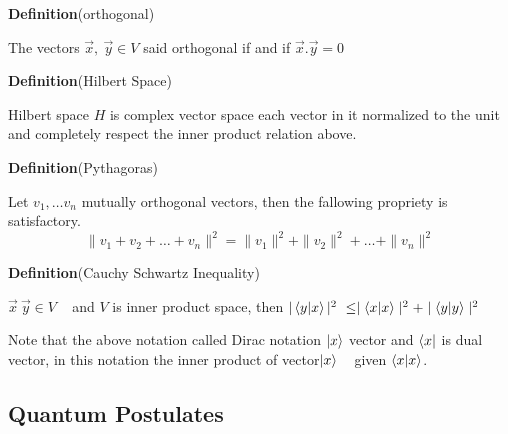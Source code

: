 
\textbf{Definition}{(orthogonal)}

The vectors $\vec{x},~ \vec{y} \in V$ said orthogonal if and if $\vec{x}.\vec{y}=0$

\textbf{Definition}{(Hilbert Space)}

Hilbert space $H$ is complex vector space  each vector in it normalized to the unit and completely  respect the inner product relation above\citep{book:4365}.

\textbf{Definition}{(Pythagoras)}

Let $v_1,\dots v_n$ mutually orthogonal vectors, then the fallowing propriety  is satisfactory.
$$\parallel v_1+v_2+\dots+v_n\parallel^2=\parallel v_1\parallel^2+\parallel v_2\parallel^2+\dots +\parallel v_n\parallel^2$$


\textbf{Definition}{(Cauchy Schwartz Inequality)}

$\vec{x} ~\vec{y} \in V $ ~ and $V$ is inner product space,
then $|\bra{y}\ket{x} |^2~\leq \mid \braket{x}{x} \mid^2+\mid \bra{y} \ket{y} \mid^2$


Note that the above notation called Dirac notation $\ket{x}$ vector and $\bra{x}$ is dual vector, in this notation the inner product of vector$\ket{x}$ ~ given $\bra{x}\ket{x}$.
\subsection{Quantum Postulates}


